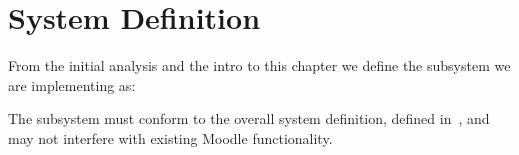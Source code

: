 \section{System Definition}
From the initial analysis and the intro to this chapter we define the subsystem we are implementing as: 
\begin{center}
\end{center}
The subsystem must conform to the overall system definition, defined in~, and may not interfere with existing Moodle functionality.